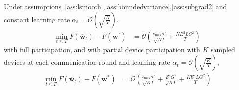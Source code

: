 \begin{thm}
	Under assumptions~\ref{ass:lsmooth},\ref{ass:boundedvariance},\ref{ass:subgrad2} and constant learning
	rate $\alpha_{t}=\mathcal{O}(\sqrt{\frac{N}{T}})$, 
	\begin{align*}
	\min_{t\leq T}F(\overline{\mathbf{w}}_{t})-F(\mathbf{w}^{\ast}) & =\mathcal{O}\left(\frac{\nu_{\max}\sigma^{2}}{\sqrt{NT}}+\frac{NE^{2}LG^{2}}{T}\right)
	\end{align*}
	with full participation, and with partial device participation with $K$ sampled devices at
	each communication round and learning rate $\alpha_{t}=\mathcal{O}(\sqrt{\frac{K}{T}})$,
	\begin{align*}
	\min_{t\leq T}F(\overline{\mathbf{w}}_{t})-F(\mathbf{w}^{\ast}) & =\mathcal{O}\left(\frac{\nu_{\max}\sigma^{2}}{\sqrt{KT}}+\frac{E^{2}G^{2}}{\sqrt{KT}}+\frac{KE^{2}LG^{2}}{T}\right)
	\end{align*}
\end{thm}

